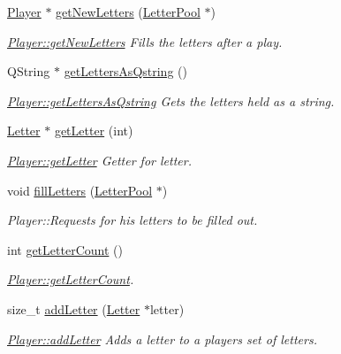 \begin{DoxyCompactItemize}
\hyperlink{class_player}{Player} $\ast$ \hyperlink{class_player_a78086401345079616a422c25cb780ecb}{get\-New\-Letters} (\hyperlink{class_letter_pool}{Letter\-Pool} $\ast$)
\begin{DoxyCompactList}\small\item\em \hyperlink{class_player_a78086401345079616a422c25cb780ecb}{Player\-::get\-New\-Letters} Fills the letters after a play. \end{DoxyCompactList}\item 
Q\-String $\ast$ \hyperlink{class_player_a2ca0e35ef05a2a14efab866f6cb32a76}{get\-Letters\-As\-Qstring} ()
\begin{DoxyCompactList}\small\item\em \hyperlink{class_player_a2ca0e35ef05a2a14efab866f6cb32a76}{Player\-::get\-Letters\-As\-Qstring} Gets the letters held as a string. \end{DoxyCompactList}\item 
\hyperlink{class_letter}{Letter} $\ast$ \hyperlink{class_player_aa6aabfbae536fec650fd466f65fb9743}{get\-Letter} (int)
\begin{DoxyCompactList}\small\item\em \hyperlink{class_player_aa6aabfbae536fec650fd466f65fb9743}{Player\-::get\-Letter} Getter for letter. \end{DoxyCompactList}\item 
void \hyperlink{class_player_a71fa8ceb20420f2c592b2fe7c50c3728}{fill\-Letters} (\hyperlink{class_letter_pool}{Letter\-Pool} $\ast$)
\begin{DoxyCompactList}\small\item\em Player\-::\-Requests for his letters to be filled out. \end{DoxyCompactList}\item 
int \hyperlink{class_player_a9def90c7578d965a506fe36d274b2403}{get\-Letter\-Count} ()
\begin{DoxyCompactList}\small\item\em \hyperlink{class_player_a9def90c7578d965a506fe36d274b2403}{Player\-::get\-Letter\-Count}. \end{DoxyCompactList}\item 
size\-\_\-t \hyperlink{class_player_a03398b3f33c323f4ad1eea16863e9a05}{add\-Letter} (\hyperlink{class_letter}{Letter} $\ast$letter)
\begin{DoxyCompactList}\small\item\em \hyperlink{class_player_a03398b3f33c323f4ad1eea16863e9a05}{Player\-::add\-Letter} Adds a letter to a players set of letters. \end{DoxyCompactList}\item 

\end{DoxyCompactItemize}
